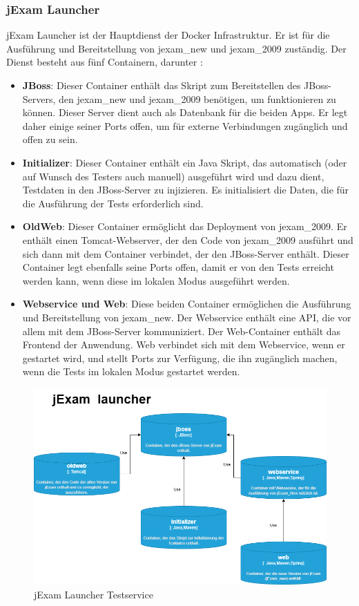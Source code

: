 \subsubsection{jExam Launcher}

jExam Launcher ist der Hauptdienst der Docker Infrastruktur. Er ist für die Ausführung
und Bereitstellung von \gls{jexam_new} und \gls{jexam_2009} zuständig. Der Dienst
besteht aus fünf Containern, darunter :

\begin{itemize}
    \setlength\itemsep{1em}

    \item[] \textbf{JBoss}: Dieser Container enthält das Skript zum
    Bereitstellen des JBoss-Servers, den \gls{jexam_new} und \gls{jexam_2009}
    benötigen, um funktionieren zu können. Dieser Server dient auch
    als Datenbank für die beiden Apps. Er legt daher einige seiner
    Ports offen, um für externe Verbindungen zugänglich und offen
    zu sein.

    \item[] \textbf{Initializer}: Dieser Container enthält ein
    Java Skript, das automatisch (oder auf Wunsch des Testers auch
    manuell) ausgeführt wird und dazu dient, Testdaten in den 
    JBoss-Server zu injizieren. Es initialisiert die Daten, die für
    die Ausführung der Tests erforderlich sind.

    \item[] \textbf{OldWeb}: Dieser Container ermöglicht das
    Deployment von \gls{jexam_2009}. Er enthält einen Tomcat-Webserver,
    der den Code von \gls{jexam_2009} ausführt und sich dann mit
    dem Container verbindet, der den JBoss-Server enthält.
    Dieser Container legt ebenfalls seine Ports offen, damit er
    von den Tests erreicht werden kann, wenn diese im lokalen 
    Modus ausgeführt werden.

    \item[] \textbf{Webservice und Web}: Diese beiden Container
    ermöglichen die Ausführung und Bereitstellung von
    \gls{jexam_new}. Der Webservice enthält eine API, die vor
    allem mit dem JBoss-Server kommuniziert. Der Web-Container
    enthält das Frontend der Anwendung. Web verbindet sich mit
    dem Webservice, wenn er gestartet wird, und stellt Ports zur
    Verfügung, die ihn zugänglich machen, wenn die Tests im
    lokalen Modus gestartet werden.
\end{itemize}

\begin{figure}[H]
    \centering
    \includegraphics[scale=0.5]{images/launcher.drawio}
    \caption{jExam Launcher Testservice} \label{fig:laucher}
\end{figure}